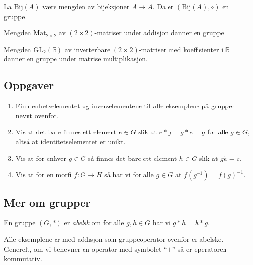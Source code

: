 \begin{example}
    La $\mathrm{Bij}(A)$ være mengden av bijeksjoner $A\to A$.
    Da er $(\mathrm{Bij}(A), \circ)$ en gruppe.
\end{example}

\begin{example}
    Mengden $\mathrm{Mat}_{2\times 2}$ av $(2\times 2)$-matriser under addisjon
    danner en gruppe.
\end{example}

\begin{example}
    Mengden $\mathrm{GL}_2(\mathbb R)$ av inverterbare $(2\times2)$-matriser
    med koeffisienter i $\mathbb R$
    danner en gruppe under matrise multiplikasjon.
\end{example}


\subsection{Oppgaver}
\begin{enumerate}
    \item Finn enhetselementet og inverselementene til alle eksemplene på
        grupper nevnt ovenfor.
    \item Vis at det bare finnes ett element $e\in G$ slik
        at $e \ast g = g\ast e = g$ for alle $g\in G$,
        altså at identitetselementet er unikt.
    \item Vis at for enhver $g\in G$ så finnes det bare ett element
        $h\in G$ slik at $gh = e$.
    \item Vis at for en morfi $f\colon G\to H$
        så har vi for alle $g\in G$ at $f(g^{-1}) = {f(g)}^{-1}$.
\end{enumerate}

\subsection{Mer om grupper}

\begin{definition}
    En gruppe $(G, \ast)$ er \textit{abelsk} om
    for alle $g,h\in G$ har vi $g\ast h = h\ast g$.
\end{definition}

\begin{example}
    Alle eksemplene er med addisjon som gruppeoperator ovenfor er abelske.
    Generelt, om vi benevner en operator med symbolet ``$+$'' så er operatoren
    kommutativ.
\end{example}

